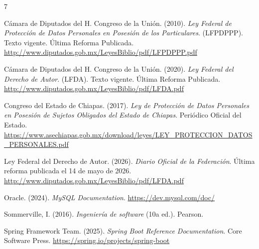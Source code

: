 \documentclass[12pt, atypical, journal]{article}
\begin{document}
\newpage

\begin{thebibliography}{7}

Cámara de Diputados del H. Congreso de la Unión. (2010). \textit{Ley Federal de Protección de Datos Personales en Posesión de los Particulares}. (LFPDPPP). Texto vigente. Última Reforma Publicada. \url{http://www.diputados.gob.mx/LeyesBiblio/pdf/LFPDPPP.pdf}

Cámara de Diputados del H. Congreso de la Unión. (2020). \textit{Ley Federal del Derecho de Autor}. (LFDA). Texto vigente. Última Reforma Publicada. \url{http://www.diputados.gob.mx/LeyesBiblio/pdf/LFDA.pdf}

Congreso del Estado de Chiapas. (2017). \textit{Ley de Protección de Datos Personales en Posesión de Sujetos Obligados del Estado de Chiapas}. Periódico Oficial del Estado. \url{https://www.asechiapas.gob.mx/download/leyes/LEY_PROTECCION_DATOS_PERSONALES.pdf}

Ley Federal del Derecho de Autor. (2026). \textit{Diario Oficial de la Federación}. Última reforma publicada el 14 de mayo de 2026. \url{http://www.diputados.gob.mx/LeyesBiblio/pdf/LFDA.pdf}

Oracle. (2024). \textit{MySQL Documentation}. \url{https://dev.mysql.com/doc/}

Sommerville, I. (2016). \textit{Ingeniería de software} (10a ed.). Pearson.

Spring Framework Team. (2025). \textit{Spring Boot Reference Documentation}. Core Software Press. \url{https://spring.io/projects/spring-boot}

\end{thebibliography}
\end{document}
